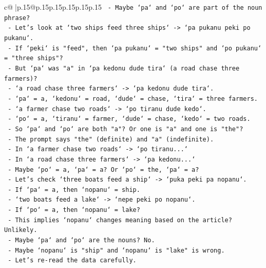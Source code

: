 \documentclass{article}
\begin{document}
{\begin{supertabular}{c@{$\;$}|p{.15\linewidth}@{}p{.15\linewidth}p{.15\linewidth}p{.15\linewidth}p{.15\linewidth}p{.15\linewidth}}
{{{\texttt{            {-} Maybe `pa` and `po` are part of the noun phrase?} \\
\texttt{            {-} Let's look at `two ships feed three ships` {-}> `pa pukanu peki po pukanu`.} \\
\texttt{              {-} If `peki` is "feed", then `pa pukanu` = "two ships" and `po pukanu` = "three ships"?} \\
\texttt{              {-} But `pa` was "a" in `pa kedonu dude tira` (a road chase three farmers)?} \\
\texttt{              {-} `a road chase three farmers` {-}> `pa kedonu dude tira`.} \\
\texttt{                {-} `pa` = a, `kedonu` = road, `dude` = chase, `tira` = three farmers.} \\
\texttt{              {-} `a farmer chase two roads` {-}> `po tiranu dude kedo`.} \\
\texttt{                {-} `po` = a, `tiranu` = farmer, `dude` = chase, `kedo` = two roads.} \\
\texttt{              {-} So `pa` and `po` are both "a"? Or one is "a" and one is "the"?} \\
\texttt{              {-} The prompt says "the" (definite) and "a" (indefinite).} \\
\texttt{              {-} In `a farmer chase two roads` {-}> `po tiranu...`} \\
\texttt{              {-} In `a road chase three farmers` {-}> `pa kedonu...`} \\
\texttt{              {-} Maybe `po` = a, `pa` = a? Or `po` = the, `pa` = a?} \\
\texttt{              {-} Let's check `three boats feed a ship` {-}> `puka peki pa nopanu`.} \\
\texttt{                {-} If `pa` = a, then `nopanu` = ship.} \\
\texttt{              {-} `two boats feed a lake` {-}> `nepe peki po nopanu`.} \\
\texttt{                {-} If `po` = a, then `nopanu` = lake?} \\
\texttt{                {-} This implies `nopanu` changes meaning based on the article? Unlikely.} \\
\texttt{                {-} Maybe `pa` and `po` are the nouns? No.} \\
\texttt{                {-} Maybe `nopanu` is "ship" and `nopanu` is "lake" is wrong.} \\
\texttt{                {-} Let's re{-}read the data carefully.} \\
}}}
\end{supertabular}}
\end{document}

